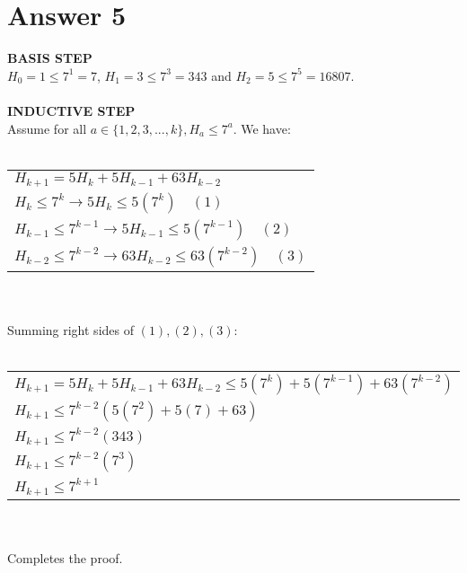 \documentclass[12pt]{article}
\begin{document}
\section*{Answer 5}
\textbf{BASIS STEP}\\
$H_0=1 \leq 7^{1}=7$, $H_1=3 \leq 7^{3}=343$ and $H_2=5 \leq 7^{5}=16807$.
\\ \\
\textbf{INDUCTIVE STEP}\\
Assume for all $a \in \{1,2,3,...,k\}, H_a \leq 7^{a}$. We have:
\\ \\
\begin{tabular}{l}
    $H_{k+1}=5H_{k}+5H_{k-1}+63H_{k-2}$\\
    $H_{k} \leq 7^{k} \rightarrow 5H_{k} \leq 5(7^{k}) \quad (1)$\\
    $H_{k-1} \leq 7^{k-1} \rightarrow 5H_{k-1} \leq 5(7^{k-1}) \quad (2)$\\
    $H_{k-2} \leq 7^{k-2} \rightarrow 63H_{k-2} \leq 63(7^{k-2}) \quad (3)$\\
\end{tabular}
\\ \\
Summing right sides of $(1), (2), (3)$:
\\ \\
\begin{tabular}{l}
    $H_{k+1}=5H_{k}+5H_{k-1}+63H_{k-2} \leq 5(7^{k})+5(7^{k-1})+63(7^{k-2})$\\
    $H_{k+1} \leq 7^{k-2}(5(7^{2})+5(7)+63)$\\
    $H_{k+1} \leq 7^{k-2}(343)$\\
    $H_{k+1} \leq 7^{k-2}(7^{3})$\\
    $H_{k+1} \leq 7^{k+1}$\\
\end{tabular}
\\ \\
Completes the proof.
\end{document}

